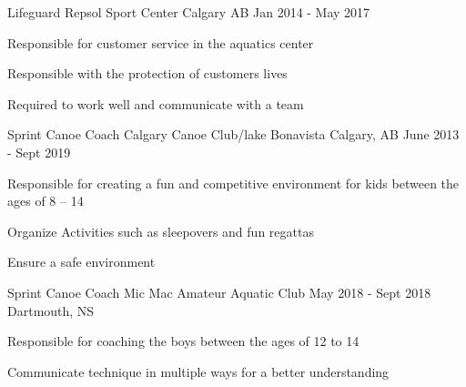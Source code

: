 \begin{cventries}
	\cventry
	{Lifeguard}
	{Repsol Sport Center}
	{Calgary AB}
	{Jan 2014 - May 2017}
	{
		\begin{cvitems}
		\item Responsible for customer service in the aquatics center 
		\item Responsible with the protection of customers lives
		\item Required to work well and communicate with a team
		\end{cvitems}
		}

	\cventry
	{Sprint Canoe Coach}
	{Calgary Canoe Club/lake Bonavista}
	{Calgary, AB}
	{June 2013 - Sept 2019}
	{
		\begin{cvitems}
		\item Responsible for creating a fun and competitive environment for kids between the ages of 8 -- 14
		\item Organize Activities such as sleepovers and fun regattas 
		\item Ensure a safe environment
		\end{cvitems}
		}
	\cventry
	{Sprint Canoe Coach}
	{Mic Mac Amateur Aquatic Club}
	{May 2018 - Sept 2018}
	{Dartmouth, NS}
	{
		\begin{cvitems}
		\item Responsible for coaching the boys between the ages of 12 to 14
		\item Communicate technique in multiple ways for a better understanding
		\end{cvitems}
		}
\end{cventries}
